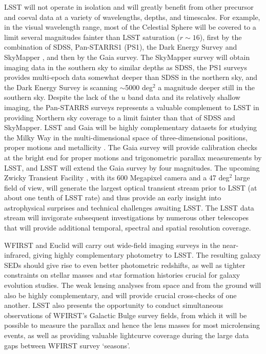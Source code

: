 LSST will not operate in isolation and will greatly benefit from other precursor and coeval
data at a variety of wavelengths, depths, and timescales. For example,
in the visual wavelength range, most of the Celestial
Sphere will be covered to a limit several magnitudes fainter than LSST saturation
($r\sim16$), first by the combination of SDSS, Pan-STARRS1 (PS1), the
Dark Energy Survey \citep{2016MNRAS.460.1270D} and SkyMapper
\citep{2007PASA...24....1K},
and then by the Gaia survey. The SkyMapper survey will obtain imaging data in the southern
sky to similar depths as SDSS, the PS1 surveys provides multi-epoch
data somewhat deeper
than SDSS in the northern sky, and the Dark Energy Survey
 is scanning
$\sim$5000 deg$^2$ a magnitude deeper still in the southern sky. Despite the lack of
the $u$ band data and its relatively shallow imaging, the Pan-STARRS surveys
represents a valuable complement to LSST in providing Northern sky coverage to a limit
fainter than that of SDSS and SkyMapper. LSST and Gaia will
be highly complementary datasets for studying the Milky Way in the multi-dimensional space of
three-dimensional positions, proper motions and metallicity \citep{2012ARA&A..50..251I}.
The Gaia survey will provide calibration checks at the bright end for proper
motions and trigonometric parallax measurements by LSST, and LSST will extend the
Gaia survey by four magnitudes. The upcoming Zwicky Transient Facility \cite[e.g.,][]{2017arXiv170801584L},
with its 600 Megapixel camera and a 47 deg$^2$ large field of view, will generate the largest
optical transient stream prior to LSST (at about one tenth of LSST rate) and thus provide
an early insight into astrophysical surprises and technical challenges awaiting LSST.
The LSST data stream will invigorate subsequent investigations by numerous other telescopes
that will provide additional temporal, spectral and spatial resolution coverage.

WFIRST and Euclid will carry out wide-field imaging surveys in the
near-infrared, giving highly complementary photometry to LSST.  The
resulting galaxy SEDs should give rise to even better photometric
redshifts, as well as tighter constraints on stellar masses and star
formation histories crucial for galaxy evolution studies.  The weak
lensing analyses from space and from the ground will also be highly
complementary, and will provide crucial cross-checks of one another.
LSST also presents the opportunity to conduct simultaneous observations
of WFIRST's Galactic Bulge survey fields, from which it will be possible to
measure the parallax and hence the lens masses for most microlensing
events, as well as providing valuable lightcurve coverage during the large
data gaps between WFIRST survey `seasons'.


